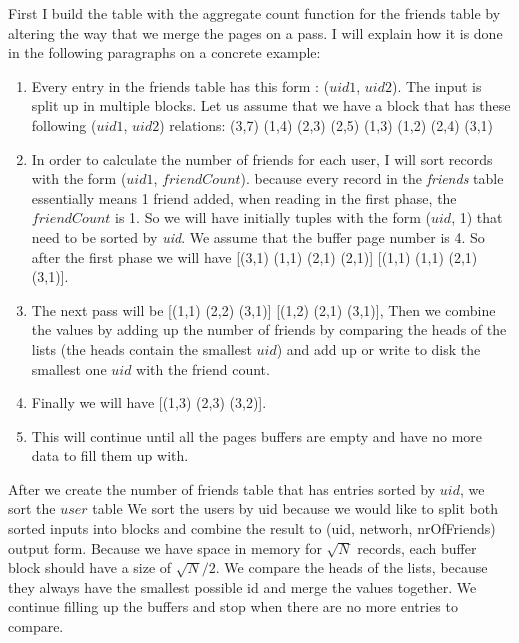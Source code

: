 \documentclass{article}      %
\begin{document}
First I build the table with the aggregate count function for the friends table by altering the way that we merge the pages on a pass. I will explain how it is done in the following paragraphs on a concrete example:

\begin{enumerate}
\item 
Every entry in the friends table has this form : ($uid1$, $uid2$). The input is split up in multiple blocks. Let us assume that we have a block that has these following ($uid1$, $uid2$) relations:
(3,7) (1,4) (2,3) (2,5) (1,3) (1,2) (2,4) (3,1)
\item
In order to calculate the number of friends for each user, I will sort records with the form ($uid1$, $friendCount$). because every record in the \emph{friends} table essentially means 1 friend added, when reading in the first phase, the $friendCount$ is 1. So we will have initially tuples with the form ($uid$, 1) that need to be sorted by \emph{uid}. We assume that the buffer page number is 4. So after the first phase we will have [(3,1) (1,1) (2,1) (2,1)] [(1,1) (1,1) (2,1) (3,1)]. 
\item
The next pass will be [(1,1) (2,2) (3,1)] [(1,2) (2,1) (3,1)], Then we combine the values by adding up the number of friends by comparing the heads of the lists (the heads contain the smallest $uid$) and add up or write to disk the smallest one $uid$ with the friend count.
\item
Finally we will have [(1,3) (2,3) (3,2)].
\item 
This will continue until all the pages buffers are empty and have no more data to fill them up with. 
\end{enumerate}

After we create the number of friends table that has entries sorted by $uid$, we sort the $user$ table We sort the users by uid because we would like to split both sorted inputs into blocks and combine the result to (uid, networh, nrOfFriends) output form. Because we have space in memory for \begin{math}\sqrt{N}\end{math} records, each buffer block should have a size of \begin{math}\sqrt{N}/2\end{math}. We compare the heads of the lists, because they always have the smallest possible id and merge the values together. We continue filling up the buffers and stop when there are no more entries to compare.
  
\end{document}
